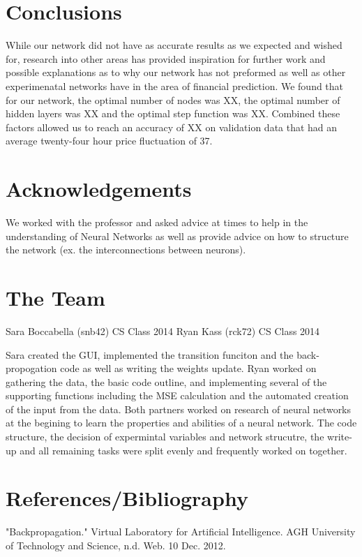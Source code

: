 \documentclass[a4paper,11pt]{article}
\begin{document}
\section{Conclusions}
While our network did not have as accurate results as we expected and wished for, research into other areas has provided inspiration for further work and possible explanations as to why our network has not preformed as well as other experimenatal networks have in the area of financial prediction. We found that for our network, the optimal number of nodes was XX, the optimal number of hidden layers was XX and the optimal step function was XX. Combined these factors allowed us to reach an accuracy of XX on validation data that had an average twenty-four hour price fluctuation of 37\cent.

\section{Acknowledgements}

We worked with the professor and asked advice at times to help in the understanding of Neural Networks as well as provide advice on how to structure the network (ex. the interconnections between neurons). 

\section{The Team}
Sara Boccabella (snb42) CS Class 2014
Ryan Kass (rck72) CS Class 2014

Sara created the GUI, implemented the transition funciton and the back-propogation code as well as writing the weights update. 
Ryan worked on gathering the data, the basic code outline, and implementing several of the supporting functions including the MSE calculation and the automated creation of the input from the data.
Both partners worked on research of neural networks at the begining to learn the properties and abilities of a neural network. The code structure, the decision of expermintal variables and network strucutre, the write-up and all remaining tasks were split evenly and frequently worked on together. 



\section{References/Bibliography}

"Backpropagation." Virtual Laboratory for Artificial Intelligence. AGH University of Technology and Science, n.d. Web. 10 Dec. 2012.\\
\end{document}
